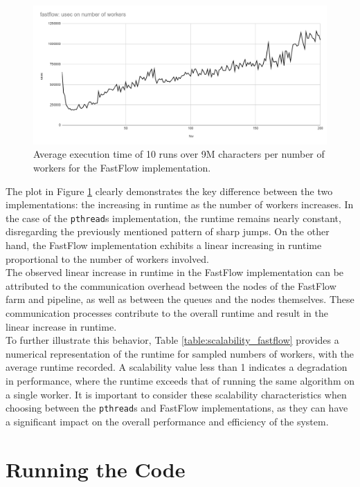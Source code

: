 \documentclass[10pt]{article}
\begin{document}
\begin{figure}[H]
\begin{center}
	\includegraphics[scale=.6]{scalability_fastflow.png}
\end{center}
\caption{Average execution time of 10 runs over 9M characters per number of workers for the FastFlow implementation.}
\label{figure:Scalability_fastflow}
\end{figure}
The plot in Figure \ref{figure:Scalability_fastflow} clearly demonstrates the key difference between the two implementations: the increasing in runtime as the number of workers increases. In the case of the \texttt{pthread}s implementation, the runtime remains nearly constant, disregarding the previously mentioned pattern of sharp jumps. On the other hand, the FastFlow implementation exhibits a linear increasing in runtime proportional to the number of workers involved.\\
The observed linear increase in runtime in the FastFlow implementation can be attributed to the communication overhead between the nodes of the FastFlow farm and pipeline, as well as between the queues and the nodes themselves. These communication processes contribute to the overall runtime and result in the linear increase in runtime.\\
To further illustrate this behavior, Table \ref{table:scalability_fastflow} provides a numerical representation of the runtime for sampled numbers of workers, with the average runtime recorded. A scalability value less than 1 indicates a degradation in performance, where the runtime exceeds that of running the same algorithm on a single worker. It is important to consider these scalability characteristics when choosing between the \texttt{pthread}s and FastFlow implementations, as they can have a significant impact on the overall performance and efficiency of the system.
\section{Running the Code} 
\end{document}
